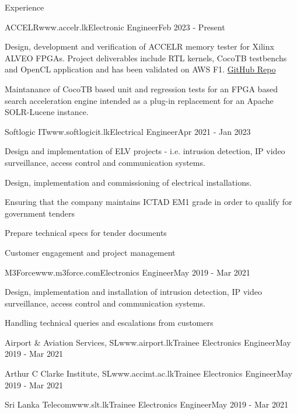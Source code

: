\documentclass[
	11pt, %
]{./../assets/resume} %
\begin{document}
\begin{rSection}{Experience}

	\begin{rSubsectionX}{ACCELR}{www.accelr.lk}{Electronic Engineer}{Feb 2023 - Present}
		\item Design, development and verification of ACCELR memory tester for Xilinx ALVEO FPGAs. Project deliverables include RTL kernels, CocoTB testbenchs and OpenCL application and has been validated on AWS F1. \href{https://github.com/accelr-net/alveo-memory-tester}{GitHub Repo}
		\item Maintanance of CocoTB based unit and regression tests for an FPGA based search acceleration engine intended as a plug-in replacement for an Apache SOLR-Lucene instance.  
	\end{rSubsectionX}

	\begin{rSubsectionX}{Softlogic IT}{www.softlogicit.lk}{Electrical Engineer}{Apr 2021 - Jan 2023}
		\item Design and implementation of ELV projects - i.e. intrusion detection, IP video surveillance, access control and communication systems.
		\item Design, implementation and commissioning of electrical installations. 
		\item Ensuring that the company maintains ICTAD EM1 grade in order to qualify for government tenders
		\item Prepare technical specs for tender documents
		\item Customer engagement and project management
	\end{rSubsectionX}

	\begin{rSubsectionX}{M3Force}{www.m3force.com}{Electronics Engineer}{May 2019 - Mar 2021}
		\item Design, implementation and installation of intrusion detection, IP video surveillance, access control and communication systems.
		\item Handling technical queries and escalations from customers 
	\end{rSubsectionX}

	\begin{rSubsectionSimpleX}{Airport \& Aviation Services, SL}{www.airport.lk}{Trainee Electronics Engineer}{May 2019 - Mar 2021}
	\end{rSubsectionSimpleX}

	\begin{rSubsectionSimpleX}{Arthur C Clarke Institute, SL}{www.accimt.ac.lk}{Trainee Electronics Engineer}{May 2019 - Mar 2021}
	\end{rSubsectionSimpleX}

	\begin{rSubsectionSimpleX}{Sri Lanka Telecom}{www.slt.lk}{Trainee Electronics Engineer}{May 2019 - Mar 2021}
	\end{rSubsectionSimpleX}


\end{rSection}
\end{document}
